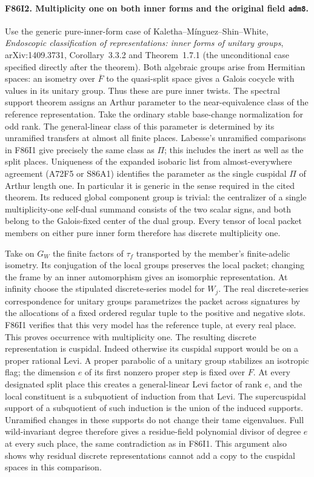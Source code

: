\paragraph{F86I2. Multiplicity one on both inner forms and the original field \textnormal{\texttt{adm8}}.}
Use the generic pure-inner-form case of Kaletha--M\'inguez--Shin--White,
\emph{Endoscopic classification of representations: inner forms
of unitary groups}, arXiv:1409.3731, Corollary~3.3.2 and
Theorem~1.7.1 (the unconditional case specified directly after the
theorem). Both algebraic groups arise from Hermitian spaces:
an isometry over $\overline F$ to the quasi-split space gives a
Galois cocycle with values in its unitary group. Thus these are
pure inner twists. The spectral support theorem assigns an Arthur
parameter to the near-equivalence class of the reference
representation. Take the ordinary stable base-change normalization
for odd rank. The general-linear class of this parameter is determined
by its unramified transfers at almost all finite places. Labesse's
unramified comparisons in F86I1 give precisely the same class as
$\Pi$; this includes the inert as well as the split places. Uniqueness
of the expanded isobaric list from almost-everywhere agreement
(A72F5 or S86A1) identifies the parameter as the single cuspidal
$\Pi$ of Arthur length one. In particular it is generic in the
sense required in the cited theorem. Its reduced global component
group is trivial: the centralizer of a single multiplicity-one
self-dual summand consists of the two scalar signs, and both
belong to the Galois-fixed center of the dual group.
Every tensor of local packet members on either pure inner form
therefore has discrete multiplicity one.

Take on $G_W$ the finite factors of $\tau_f$ transported by
the member's finite-adelic isometry. Its conjugation of the local
groups preserves the local packet; changing the frame by an inner
automorphism gives an isomorphic representation. At infinity
choose the stipulated discrete-series model for $W_j$. The real
discrete-series correspondence for unitary groups parametrizes the
packet across signatures by the allocations of a fixed ordered
regular tuple to the positive and negative slots. F86I1 verifies
that this very model has the reference tuple, at every real
place. This proves occurrence with multiplicity one. The resulting
discrete representation is cuspidal. Indeed otherwise its
cuspidal support would be on a proper rational Levi. A proper
parabolic of a unitary group stabilizes an isotropic flag; the
dimension $e$ of its first nonzero proper step is fixed over $F$.
At every designated split place this creates a general-linear
Levi factor of rank $e$, and the local constituent is a subquotient
of induction from that Levi. The supercuspidal support of a
subquotient of such induction is the union of the induced
supports. Unramified changes in these supports do not change
their tame eigenvalues. Full wild-invariant degree therefore gives
a residue-field polynomial divisor of degree $e$ at every such
place, the same contradiction as in F86I1. This argument also
shows why residual discrete representations cannot add a copy
to the cuspidal spaces in this comparison.


